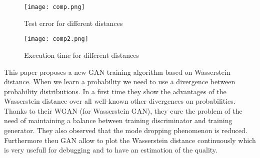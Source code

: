\begin{figure}[h]
	\centering
	\texttt{[image: comp.png]}
	\caption{Test error for different distances}
	\label{comp}
\end{figure}
\begin{figure}[h]
\centering
\texttt{[image: comp2.png]}
\caption{Execution time for different distances}
\label{comp2}
\end{figure}

\newpage


This paper proposes a new GAN training algorithm based on Wasserstein distance. When we learn a probability we need to use a divergence between probability distributions. In a first time they show the advantages of the Wasserstein distance over all well-known other divergences on probabilities. Thanks to their WGAN (for Wasserstein GAN), they cure the problem of the need of maintaining a balance between training discriminator and training generator. They also observed that the mode dropping phenomenon is reduced. Furthermore theu GAN allow to plot the Wasserstein distance continuously which is very usefull for debugging and to have an estimation of the quality.

